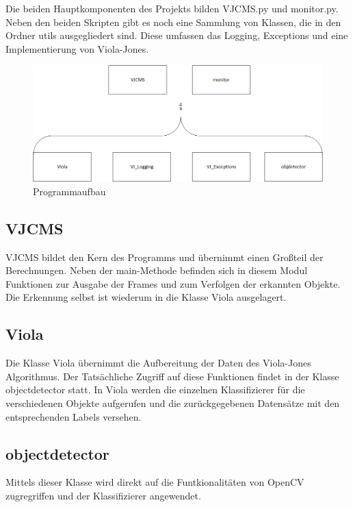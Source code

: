Die beiden Hauptkomponenten des Projekts bilden VJCMS.py und monitor.py. Neben den beiden Skripten gibt es noch eine Sammlung von Klassen, die in den Ordner utils ausgegliedert sind. Diese umfassen das Logging, Exceptions und eine Implementierung von Viola-Jones.

\begin{figure}[H]
\centering
\includegraphics[width=0.7\linewidth]{img/vjcms_structure.png}
\caption{Programmaufbau}
\label{fig: structure}
\end{figure}

\subsection{VJCMS}

VJCMS bildet den Kern des Programms und übernimmt einen Großteil der Berechnungen. Neben der main-Methode befinden sich in diesem Modul Funktionen zur Ausgabe der Frames und zum Verfolgen der erkannten Objekte. Die Erkennung selbst ist wiederum in die Klasse Viola ausgelagert. 
\subsection{Viola}
\label{viola_jones}
Die Klasse Viola übernimmt die Aufbereitung der Daten des Viola-Jones Algorithmus. Der Tatsächliche Zugriff auf diese Funktionen findet in der Klasse objectdetector statt. In Viola werden die einzelnen Klassifizierer für die verschiedenen Objekte aufgerufen und die zurückgegebenen Datensätze mit den entsprechenden Labels versehen. 

\subsection{objectdetector}
Mittels dieser Klasse wird direkt auf die Funtkionalitäten von OpenCV zugregriffen und der Klassifizierer angewendet.

